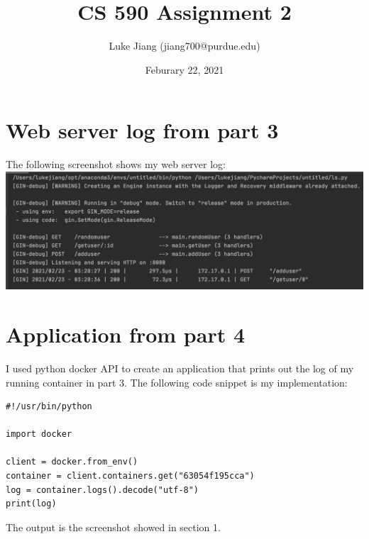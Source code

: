 \documentclass{article}
\title{CS 590 Assignment 2}
\author{Luke Jiang (jiang700@purdue.edu) }
\date{Feburary 22, 2021}
\begin{document}
\maketitle
\section{Web server log from part 3}
The following screenshot shows my web server log: \\
\includegraphics[scale=0.5]{ass2-log.png}


\section{Application from part 4}
I used python docker API to create an application that prints out the log of my running container in part 3. The following code snippet is my implementation:
\begin{lstlisting}
#!/usr/bin/python

import docker

client = docker.from_env()
container = client.containers.get("63054f195cca")
log = container.logs().decode("utf-8")
print(log)
\end{lstlisting}
The output is the screenshot showed in section 1.
\end{document}
